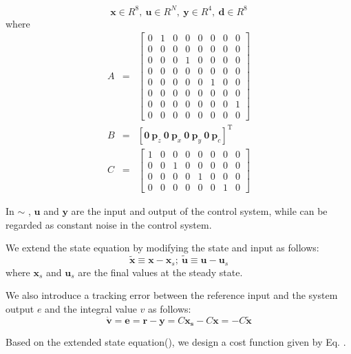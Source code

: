 \begin{equation*}
  \bm{x} \in  R^8, \ \bm{u} \in R^N, \ \bm{y} \in R^4, \ \bm{d} \in R^8
\end{equation*}
where 
\begin{eqnarray*}
  A&=&
  \begin{bmatrix}
    0 &1 &0 &0 &0 &0 &0 &0\\
    0 &0 &0 &0 &0 &0 &0 &0\\
    0 &0 &0 &1 &0 &0 &0 &0\\
    0 &0 &0 &0 &0 &0 &0 &0\\
    0 &0 &0 &0 &0 &1 &0 &0\\
    0 &0 &0 &0 &0 &0 &0 &0\\
    0 &0 &0 &0 &0 &0 &0 &1\\
    0 &0 &0 &0 &0 &0 &0 &0
  \end{bmatrix}\\
  B&=&[\bm{0} \ \bm{p}_z \ \bm{0} \ \bm{p}_x \ \bm{0} \ \bm{p}_y \ \bm{0} \ \bm{p}_c]^\mathrm{T}\\
  C&=&
  \begin{bmatrix}
    1 &0 &0 &0 &0 &0 &0 &0\\
    0 &0 &1 &0 &0 &0 &0 &0\\
    0 &0 &0 &0 &1 &0 &0 &0\\
    0 &0 &0 &0 &0 &0 &1 &0
  \end{bmatrix}
\end{eqnarray*}

In  $\sim$ , $\bm{u}$ and $\bm{y}$ are the input and output of the control system, while
can be regarded as constant noise in the control system. 
\par
We extend the state equation by modifying the state and input as follows:
\begin{equation}
  \tilde{\bm{x}} \equiv \bm{x}-\bm{x}_s; \ \tilde{\bm{u}} \equiv \bm{u}-\bm{u}_s 
\end{equation}
where $\bm{x}_s$ and $\bm{u}_s$ are the final values at the steady state.
\par
We also introduce a tracking error between the reference input and the system output $e$ and the integral value $v$ as follows: 
\begin{equation}
  \dot{\bm{v}}=\bm{e}=\bm{r}-\bm{y}=C\bm{x_s}-C\bm{x}=-C\tilde{\bm{x}}
\end{equation}
\par
Based on the extended state equation(), we design a cost function given by Eq. .

